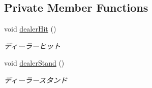 \subsection*{Private Member Functions}
\begin{DoxyCompactItemize}
\item 
void \hyperlink{classjp_1_1gr_1_1java__conf_1_1yuta__yoshinaga_1_1java__trumpcards_1_1_black_jack_a3db7b3231ab583af54941a41517954ea}{dealer\+Hit} ()
\begin{DoxyCompactList}\small\item\em ディーラーヒット \end{DoxyCompactList}\item 
void \hyperlink{classjp_1_1gr_1_1java__conf_1_1yuta__yoshinaga_1_1java__trumpcards_1_1_black_jack_a49f2f12998ffa9892f4e8212f85afc7f}{dealer\+Stand} ()
\begin{DoxyCompactList}\small\item\em ディーラースタンド \end{DoxyCompactList}\end{DoxyCompactItemize}
